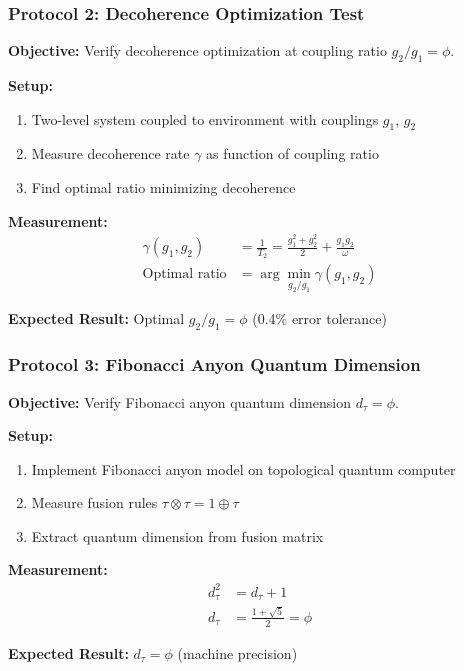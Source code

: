 \documentclass[11pt]{article}
\theoremstyle{definition}
\newcommand{\goldenratio}{\phi}
\begin{document}
\subsubsection{Protocol 2: Decoherence Optimization Test}

\textbf{Objective:} Verify decoherence optimization at coupling ratio $g_2/g_1 = \goldenratio$.

\textbf{Setup:}
\begin{enumerate}
\item Two-level system coupled to environment with couplings $g_1$, $g_2$
\item Measure decoherence rate $\gamma$ as function of coupling ratio
\item Find optimal ratio minimizing decoherence
\end{enumerate}

\textbf{Measurement:}
\begin{align}
\gamma(g_1, g_2) &= \frac{1}{T_2} = \frac{g_1^2 + g_2^2}{2} + \frac{g_1 g_2}{\omega} \\
\text{Optimal ratio} &= \arg\min_{g_2/g_1} \gamma(g_1, g_2)
\end{align}

\textbf{Expected Result:} Optimal $g_2/g_1 = \goldenratio$ (0.4\% error tolerance)

\subsubsection{Protocol 3: Fibonacci Anyon Quantum Dimension}

\textbf{Objective:} Verify Fibonacci anyon quantum dimension $d_\tau = \goldenratio$.

\textbf{Setup:}
\begin{enumerate}
\item Implement Fibonacci anyon model on topological quantum computer
\item Measure fusion rules $\tau \otimes \tau = 1 \oplus \tau$
\item Extract quantum dimension from fusion matrix
\end{enumerate}

\textbf{Measurement:}
\begin{align}
d_\tau^2 &= d_\tau + 1 \\
d_\tau &= \frac{1 + \sqrt{5}}{2} = \goldenratio
\end{align}

\textbf{Expected Result:} $d_\tau = \goldenratio$ (machine precision)
\end{document}
